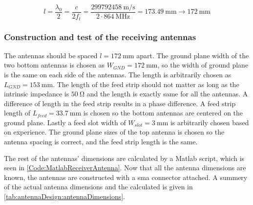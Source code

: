 \begin{equation}
l = \frac{\lambda_0}{2} = \frac{c}{2f_t}= \frac{\SI{299792458}{\meter\per\second}}{2\cdot \SI{864}{\mega\hertz}} = \SI{173.49}{\milli\meter} \to \SI{172}{\milli\meter}\label{eq:design:antennaDistanceL}
\end{equation}
\startexplain
{}
\stopexplain

\subsubsection{Construction and test of the receiving antennas}
The antennas should be spaced $l=\SI{172}{\milli\meter}$ apart. The ground plane width of the two bottom antennas is chosen as $W_{GND}=\SI{172}{\milli\meter}$, so the width of ground plane is the same on each side of the antennas. The length is arbitrarily chosen as $L_{GND}=\SI{153}{\milli\meter}$. The length of the feed strip should not matter as long as the intrinsic impedance is $\SI{50}{\ohm}$ and the length is exactly same for all the antennas. A difference of length in the feed strip results in a phase difference. A feed strip length of $L_{feed} =\SI{33.7}{\milli\meter}$ is chosen so the bottom antennas are centered on the ground plane. Lastly a feed slot width of $W_{slot}=\SI{3}{\milli\meter}$ is arbitrarily chosen based on experience. The ground plane sizes of the top antenna is chosen so the antenna spacing is correct, and the feed strip length is the same.

The rest of the antennas' dimensions are calculated by a Matlab script, which is seen in \autoref{Code:MatlabReceiverAntenna}. Now that all the antenna dimensions are known, the antennas are constructed with a \gls{sma} connector attached. A summery of the actual antenna dimensions and the calculated is given in \autoref{tab:antennaDesign:antennaDimensions}. 

